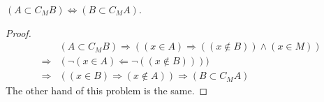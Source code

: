 \begin{question}
    $(A\subset C_{M}B)\Leftrightarrow (B\subset C_{M}A)$.
\end{question}
\begin{proof}
    \[\begin{aligned}
        &(A\subset C_{M}B)\Rightarrow ((x\in A)\Rightarrow((x\not\in B))\wedge(x\in M))\\ \Rightarrow& (\lnot(x\in A)\Leftarrow \lnot((x\not\in B))))\\
        \Rightarrow&((x\in B)\Rightarrow(x\not\in A))\Rightarrow(B\subset C_{M}A)
    \end{aligned}\]
    The other hand of this problem is the same.
\end{proof}
